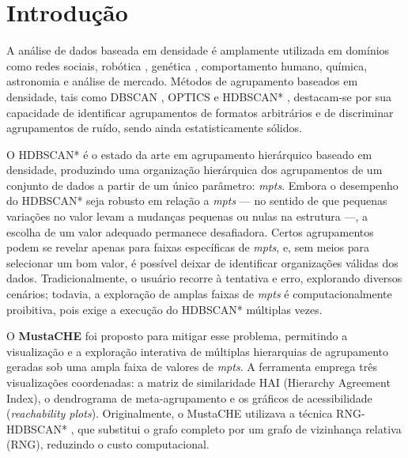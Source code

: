 \documentclass[12pt,a4paper,oneside]{article}
\begin{document}
\section{Introdução}

A análise de dados baseada em densidade é amplamente utilizada em domínios como redes sociais,
robótica \cite{savoie2019robot}, genética \cite{norman2019exploring}, comportamento humano,
química, astronomia e análise de mercado. Métodos de agrupamento baseados em densidade, tais
como DBSCAN \cite{ester1996density}, OPTICS \cite{ankerst1999optics} e HDBSCAN*
\cite{campello2015hierarchical}, destacam-se por sua capacidade de identificar agrupamentos de
formatos arbitrários e de discriminar agrupamentos de ruído, sendo ainda estatisticamente
sólidos.

O HDBSCAN* é o estado da arte em agrupamento hierárquico baseado em densidade, produzindo uma
organização hierárquica dos agrupamentos de um conjunto de dados a partir de um único
parâmetro: \textit{mpts}. Embora o desempenho do HDBSCAN* seja robusto em relação a
\textit{mpts} --- no sentido de que pequenas variações no valor levam a mudanças pequenas ou
nulas na estrutura ---, a escolha de um valor adequado permanece desafiadora. Certos
agrupamentos podem se revelar apenas para faixas específicas de \textit{mpts}, e, sem meios
para selecionar um bom valor, é possível deixar de identificar organizações válidas dos dados.
Tradicionalmente, o usuário recorre à tentativa e erro, explorando diversos cenários; todavia,
a exploração de amplas faixas de \textit{mpts} é computacionalmente proibitiva, pois exige a
execução do HDBSCAN* múltiplas vezes.

O \textbf{MustaCHE} \cite{neto2018mustache} foi proposto para mitigar esse problema,
permitindo a visualização e a exploração interativa de múltiplas hierarquias de agrupamento
geradas sob uma ampla faixa de valores de \textit{mpts}. A ferramenta emprega três
visualizações coordenadas: a matriz de similaridade HAI (Hierarchy Agreement Index), o
dendrograma de meta-agrupamento e os gráficos de acessibilidade (\textit{reachability plots}).
Originalmente, o MustaCHE utilizava a técnica RNG-HDBSCAN* \cite{neto2017efficient}, que
substitui o grafo completo por um grafo de vizinhança relativa (RNG), reduzindo o custo
computacional.
\end{document}
